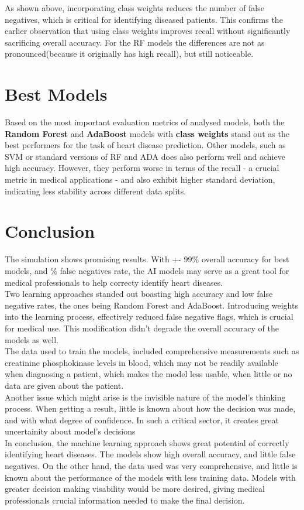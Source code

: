\documentclass[conference]{IEEEtran}
\begin{document}
As shown above, incorporating class weights reduces the number of false negatives, which is critical
for identifying diseased patients. This confirms the earlier observation that using class weights improves recall
without significantly sacrificing overall accuracy. For the RF models the differences are not as pronounced(because
it originally has high recall), but still noticeable.

\section{Best Models}
Based on the most important evaluation metrics of analysed models, both the \textbf{Random Forest}
and \textbf{AdaBoost} models with \textbf{class weights} 
stand out as the best performers for the task of heart disease prediction. 
Other models, such as SVM or standard versions of
RF and ADA does also perform well and achieve high accuracy. However, they perform worse in terms of the recall 
- a crucial metric in medical applications -
and also exhibit higher standard deviation, indicating less stability across different data splits.

\section{Conclusion}

The simulation shows promising results. With +- 99\% overall accuracy for best models, and \% false negatives rate,
the AI models may serve as a great tool for medical professionals to help correcty identify heart diseases. \\

Two learning approaches standed out boasting high accuracy and low false negative rates, the ones being Random Forest and AdaBoost.
Introducing weights into the learning process, effectively reduced false negative flags, which is crucial for medical use. This
modification didn't degrade the overall accuracy of the models as well. \\

The data used to train the models, included comprehensive measurements such as creatinine phosphokinase levels
in blood, which may not be readily available when diagnosing a patient, which makes the model less usable, when
little or no data are given about the patient. \\

Another issue which might arise is the invisible nature of the model's thinking process.
When getting a result, little is known about how the decision was made, and with what degree
of confidence. In such a critical sector, it creates great uncertainity about model's decisions \\

In conclusion, the machine learning approach shows great potential of correctly identifying heart diseases.
The models show high overall accuracy, and little false negatives. On the other hand, the data used was very comprehensive,
and little is known about the performance of the models with less training data. Models with greater decision making visability
would be more desired, giving medical professionals crucial information needed to make the final decision.
\end{document}
